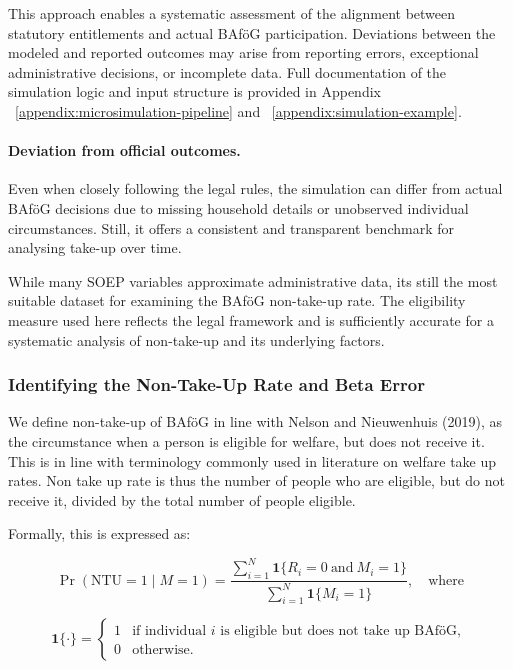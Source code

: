 This approach enables a systematic assessment of the alignment between statutory entitlements and actual BAföG participation. 
Deviations between the modeled and reported outcomes may arise from reporting errors, exceptional administrative decisions, or incomplete data. 
Full documentation of the simulation logic and input structure is provided in Appendix ~\ref{appendix:microsimulation-pipeline} and ~\ref{appendix:simulation-example}.

\paragraph{Deviation from official outcomes.}
Even when closely following the legal rules, the simulation can differ from actual BAföG decisions due to missing household details or unobserved individual circumstances. 
Still, it offers a consistent and transparent benchmark for analysing take-up over time.

While many SOEP variables approximate administrative data, its still the most suitable dataset for examining the BAföG non-take-up rate. 
The eligibility measure used here reflects the legal framework and is sufficiently accurate for a systematic analysis of non-take-up and its underlying factors.


\subsubsection{Identifying the Non-Take-Up Rate and Beta Error}
We define non-take-up of BAföG in line with Nelson and Nieuwenhuis (2019), as the circumstance when a person is eligible for welfare, but does not receive it. This is in line with terminology commonly used in literature on welfare take up rates. Non take up rate is thus the number of people who are eligible, but do not receive it, divided by the total number of people eligible. 


Formally, this is expressed as:

\begin{equation}
\Pr(\text{NTU} = 1 \mid M = 1) = \frac{\sum_{i=1}^{N} \mathbf{1}\{R_i = 0 \ \text{and} \ M_i = 1\}}{\sum_{i=1}^{N} \mathbf{1}\{M_i = 1\}}, \quad\text{where} 
\end{equation}

\begin{equation}
  \mathbf{1}\{\cdot\} =
  \begin{cases}
  1 & \text{if individual } i \text{ is eligible but does not take up BAföG}, \\
  0 & \text{otherwise}.
  \end{cases}
\label{eq:indicator-function-ntu}
\end{equation}


